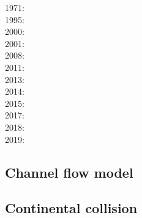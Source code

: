 \noindent
{\scriptsize
1971: \cite{stbe71}\\
1995: \cite{fige95}\\
2000: \cite{acgf00}\cite{trla00}\\
2001: \cite{masc01}\\
2008: \cite{manc08}\cite{scsf08}\\
2011: \cite{frem11}\\
2013: \cite{soma13}\cite{lehl13}\\
2014: \cite{olbm14}\\
2015: \cite{pevp15}\cite{jalr15}\\
2017: \cite{naam17}\cite{scdu17}\\
2018: \cite{naam18}\\
2019: \cite{llor19}\cite{yada19}\cite{sogh19}
}

\subsection{Channel flow model} 

{\scriptsize
\cite{jabm04}
\cite{jabn06}\cite{mebe06}\cite{benj06}
\cite{jabn07}
\cite{jabe11}
}

\subsection*{Continental collision} 

{\scriptsize
\cite{mota75}
\cite{hoen86a}
\cite{elbj98}\cite{bubr98}
\cite{elbe99}\cite{will99b}
\cite{sobm00}
\cite{refm03}
\cite{sobb05}
\cite{sckb09}
\cite{lemk11}
\cite{mavf12}
\cite{scpo13}
\cite{lesh14}
\cite{puka15}
\cite{masg18}\cite{gesr18}
}

